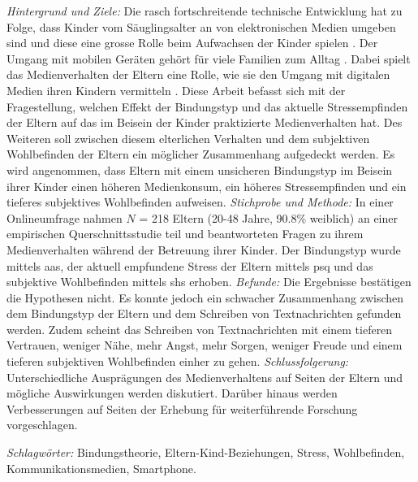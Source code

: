 \begin{flushleft}
\textit{Hintergrund und Ziele:} Die rasch fortschreitende technische Entwicklung hat zu Folge, dass Kinder vom Säuglingsalter an von elektronischen Medien umgeben sind und diese eine grosse Rolle beim Aufwachsen der Kinder spielen \cite{Feierabend2015}. Der Umgang mit mobilen Geräten gehört für viele Familien zum Alltag \cite{Wagner2016}. Dabei spielt das Medienverhalten der Eltern eine Rolle, wie sie den Umgang mit digitalen Medien ihren Kindern vermitteln \cite{Livingstone2015a}. Diese Arbeit befasst sich mit der Fragestellung, welchen Effekt der Bindungstyp und das aktuelle Stressempfinden der Eltern auf das im Beisein der Kinder praktizierte Medienverhalten hat. Des Weiteren soll zwischen diesem elterlichen Verhalten und dem subjektiven Wohlbefinden der Eltern ein möglicher Zusammenhang aufgedeckt werden. Es wird angenommen, dass Eltern mit einem unsicheren Bindungstyp im Beisein ihrer Kinder einen höheren Medienkonsum, ein höheres Stressempfinden und ein tieferes subjektives Wohlbefinden aufweisen. \textit{Stichprobe und Methode:} In einer Online\-umfrage nahmen $N$ = 218 Eltern (20-48 Jahre, 90.8\% weiblich) an einer empirischen Querschnittsstudie teil und beantworteten Fragen zu ihrem Medienverhalten während der Betreuung ihrer Kinder. Der Bindungstyp wurde mittels \acrfull{aas}, der aktuell empfundene Stress der Eltern mittels \acrfull{psq} und das subjektive Wohlbefinden mittels \acrfull{shs} erhoben. 
\textit{Befunde:} Die Ergebnisse bestätigen die Hypothesen nicht. Es konnte jedoch ein schwacher Zusammenhang zwischen dem Bindungstyp der Eltern und dem Schreiben von Textnachrichten gefunden werden. Zudem scheint das Schreiben von Textnachrichten mit einem tieferen Vertrauen, weniger Nähe, mehr Angst, mehr Sorgen, weniger Freude und einem tieferen subjektiven Wohlbefinden einher zu gehen. 
\textit{Schlussfolgerung:} Unterschiedliche Ausprägungen des Medienverhaltens auf Seiten der Eltern und mögliche Auswirkungen werden diskutiert. Darüber hinaus werden Verbesserungen auf Seiten der Erhebung für weiterführende Forschung vorgeschlagen. \linebreak


\textit{Schlagwörter:} Bindungstheorie, Eltern-Kind-Beziehungen, Stress, Wohlbefinden, Kommunikationsmedien, Smartphone.

\end{flushleft}
